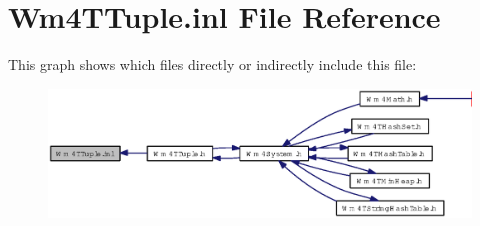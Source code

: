 \section{Wm4TTuple.inl File Reference}
\label{Wm4TTuple_8inl}


This graph shows which files directly or indirectly include this file:\begin{figure}[H]
\begin{center}
\leavevmode
\includegraphics[width=345pt]{Wm4TTuple_8inl__dep__incl}
\end{center}
\end{figure}
